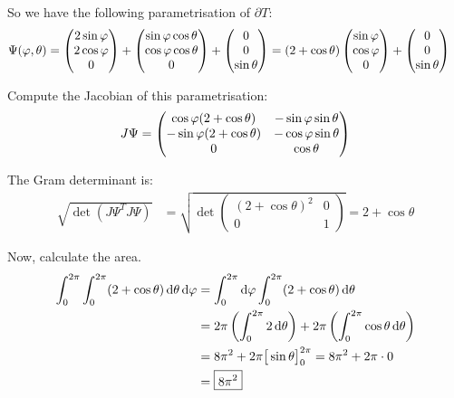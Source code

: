 \documentclass[12pt]{article}
\begin{document}
So we have the following parametrisation of $\partial T$:
\begin{align*}
    \Psi(\varphi, \theta) &= \begin{pmatrix} 2\sin\varphi \\ 2\cos\varphi \\ 0 \end{pmatrix} + \begin{pmatrix} \sin\varphi\cos\theta \\ \cos\varphi\cos\theta \\ 0 \end{pmatrix} + \begin{pmatrix} 0 \\ 0 \\ \sin\theta \end{pmatrix} = (2 + \cos\theta) \begin{pmatrix} \sin\varphi \\ \cos\varphi \\ 0 \end{pmatrix} + \begin{pmatrix} 0 \\ 0 \\ \sin\theta \end{pmatrix}
\end{align*}

Compute the Jacobian of this parametrisation:
\begin{align*}
    J \Psi =
    \begin{pmatrix}
        \cos\varphi(2 + \cos\theta) & -\sin\varphi\sin\theta \\
        -\sin\varphi(2 + \cos\theta) & -\cos\varphi\sin\theta \\
        0 & \cos\theta
    \end{pmatrix}
\end{align*}

The Gram determinant is:
\begin{align*}
    \sqrt{\det(J \Psi^T J\Psi)} &= \sqrt{\det
    \begin{pmatrix}
        (2 + \cos\theta)^2 & 0 \\
        0 & 1
    \end{pmatrix}}
    = 2 + \cos\theta
\end{align*}

Now, calculate the area.
\begin{align*}
    \int_{0}^{2\pi} \int_{0}^{2\pi} (2 + \cos\theta) \mathop{}\!\mathrm{d} \theta \mathop{}\!\mathrm{d} \varphi &= \int_{0}^{2\pi} \mathop{}\!\mathrm{d} \varphi \int_{0}^{2\pi} (2 + \cos\theta) \mathop{}\!\mathrm{d} \theta \\
    &= 2\pi \left(\int_{0}^{2\pi} 2 \mathop{}\!\mathrm{d} \theta\right) +  2\pi \left(\int_{0}^{2\pi} \cos\theta \mathop{}\!\mathrm{d} \theta\right) \\
    &= 8\pi^2 + 2\pi \big[ \sin\theta \big]_{0}^{2\pi} = 8\pi^2 + 2\pi \cdot 0 \\
    &= \boxed{8 \pi^2}
\end{align*}
\end{document}
